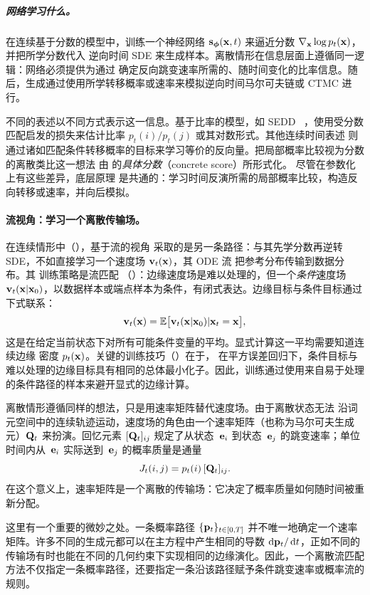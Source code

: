\subparagraph{网络学习什么。}
在连续基于分数的模型中，训练一个神经网络
${\mathbf{s}}_{\bm{\phi}}({\mathbf{x}}, t)$ 来逼近分数
$\nabla_{{\mathbf{x}}}\log p_t({\mathbf{x}})$，并把所学分数代入
逆向时间 SDE 来生成样本。离散情形在信息层面上遵循同一逻辑：网络必须提供为通过
 确定反向跳变速率所需的、随时间变化的比率信息。随后，生成通过使用所学转移概率或速率来模拟逆向时间马尔可夫链或 CTMC 进行。

不同的表述以不同方式表示这一信息。基于比率的模型，如 SEDD~\citep{lou2024discrete}
，使用受分数匹配启发的损失来估计比率 $p_t(i)/p_t(j)$ 或其对数形式。其他连续时间表述
\citep{campbell2022continuous,sun2023scorebased} 则通过诸如匹配条件转移概率的目标来学习等价的反向量。把局部概率比较视为分数的离散类比这一想法
由 \citet{meng2022concrete} 的\emph{具体分数}（concrete score）所形式化。
尽管在参数化上有这些差异，底层原理
是共通的：学习时间反演所需的局部概率比较，构造反向转移或速率，并向后模拟。

\paragraph{流视角：学习一个离散传输场。}
在连续情形中（），基于流的视角
采取的是另一条路径：与其先学分数再逆转
SDE，不如直接学习一个速度场 ${\mathbf{v}}_t({\mathbf{x}})$，其 ODE 流
把参考分布传输到数据分布。其
训练策略是流匹配
（）：边缘速度场是难以处理的，但一个\emph{条件}速度场
${\mathbf{v}}_t({\mathbf{x}} | {\mathbf{x}}_0)$，以数据样本或端点样本为条件，有闭式表达。边缘目标与条件目标通过下式联系：
\[
{\mathbf{v}}_t({\mathbf{x}})
= \mathbb{E} \big[{\mathbf{v}}_t({\mathbf{x}} | {\mathbf{x}}_0) | {\mathbf{x}}_t = {\mathbf{x}}\big],
\]
这是在给定当前状态下对所有可能条件变量的平均。显式计算这一平均需要知道连续边缘
密度 $p_t({\mathbf{x}})$。关键的训练技巧（）在于，
在平方误差回归下，条件目标与难以处理的边缘目标具有相同的总体最小化子。因此，训练通过使用来自易于处理的条件路径的样本来避开显式的边缘计算。

离散情形遵循同样的想法，只是用速率矩阵替代速度场。由于离散状态无法
沿词元空间中的连续轨迹运动，速度场的角色由一个速率矩阵（也称为马尔可夫生成元）${\mathbf{Q}}_t$ 来扮演。回忆元素 $[{\mathbf{Q}}_t]_{ij}$ 规定了从状态~${\mathbf{e}}_i$ 到状态~${\mathbf{e}}_j$ 的跳变速率；单位时间内从~${\mathbf{e}}_i$ 实际送到~${\mathbf{e}}_j$ 的概率质量是通量
\[
J_t(i,j)=p_t(i)\,[{\mathbf{Q}}_t]_{ij}.
\]
在这个意义上，速率矩阵是一个离散的传输场：它决定了概率质量如何随时间被重新分配。

这里有一个重要的微妙之处。一条概率路径 $\{{\mathbf{p}}_t\}_{t\in[0,T]}$ 并不唯一地确定一个速率矩阵。许多不同的生成元都可以在主方程中产生相同的导数 $\mathop{}\!\mathrm{d}{\mathbf{p}}_t/\mathop{}\!\mathrm{d} t$，正如不同的传输场有时也能在不同的几何约束下实现相同的边缘演化。因此，一个离散流匹配方法不仅指定一条概率路径，还要指定一条沿该路径赋予条件跳变速率或概率流的规则。

